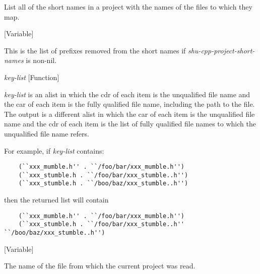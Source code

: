 \begin{doc-string}
List all of the short names in a project with the names of the files to
which they map.
\end{doc-string}

\vspace{1em}
\noindent
{}
\usebox{\funcname}
 \hfill [Variable]

\begin{doc-string}
This is the list of prefixes removed from the short names if
\emph{shu-cpp-project-short-names} is non-nil.
\end{doc-string}

\vspace{1em}
\noindent
{}
\usebox{\funcname}\emph{key-list}
 \hfill [Function]

\begin{doc-string}
\emph{key-list} is an alist in which the cdr of each item is the unqualified file name
and the car of each item is the fully qualified file name, including the path to
the file.  The output is a different alist in which the car of each item is the
unqualified file name and the cdr of each item is the list of fully qualified
file names to which the unqualified file name refers.

For example, if \emph{key-list} contains:

\small{\begin{verbatim}
    (``xxx_mumble.h'' . ``/foo/bar/xxx_mumble.h'')
    (``xxx_stumble.h . ``/foo/bar/xxx_stumble..h'')
    (``xxx_stumble.h . ``/boo/baz/xxx_stumble..h'')
\end{verbatim}}

then the returned list will contain

\small{\begin{verbatim}
    (``xxx_mumble.h'' . ``/foo/bar/xxx_mumble.h'')
    (``xxx_stumble.h . ``/foo/bar/xxx_stumble..h'' ``/boo/baz/xxx_stumble..h'')
\end{verbatim}}
\end{doc-string}

\vspace{1em}
\noindent
{}
\usebox{\funcname}
 \hfill [Variable]

\begin{doc-string}
The name of the file from which the current project was read.
\end{doc-string}

